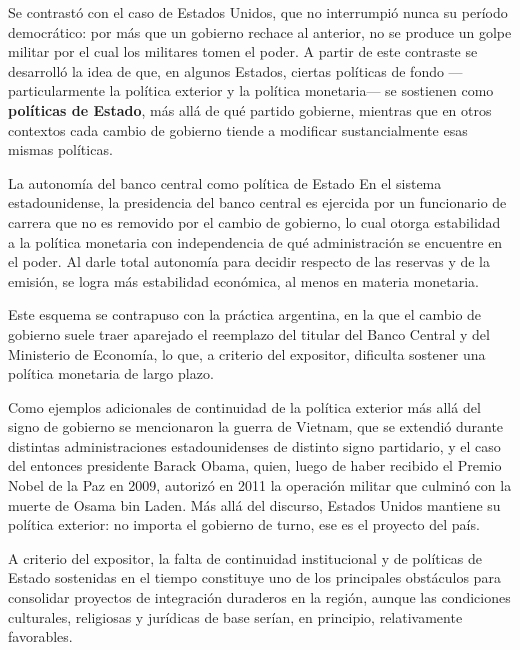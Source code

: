 \documentclass[12pt,oneside]{book}
\begin{document}
Se contrastó con el caso de Estados Unidos, que no interrumpió nunca su período democrático: por más que un gobierno rechace al anterior, no se produce un golpe militar por el cual los militares tomen el poder. A partir de este contraste se desarrolló la idea de que, en algunos Estados, ciertas políticas de fondo —particularmente la política exterior y la política monetaria— se sostienen como \textbf{políticas de Estado}, más allá de qué partido gobierne, mientras que en otros contextos cada cambio de gobierno tiende a modificar sustancialmente esas mismas políticas.

\begin{example}{La autonomía del banco central como política de Estado}
En el sistema estadounidense, la presidencia del banco central es ejercida por un funcionario de carrera que no es removido por el cambio de gobierno, lo cual otorga estabilidad a la política monetaria con independencia de qué administración se encuentre en el poder. Al darle total autonomía para decidir respecto de las reservas y de la emisión, se logra más estabilidad económica, al menos en materia monetaria.

Este esquema se contrapuso con la práctica argentina, en la que el cambio de gobierno suele traer aparejado el reemplazo del titular del Banco Central y del Ministerio de Economía, lo que, a criterio del expositor, dificulta sostener una política monetaria de largo plazo.
\end{example}

Como ejemplos adicionales de continuidad de la política exterior más allá del signo de gobierno se mencionaron la guerra de Vietnam, que se extendió durante distintas administraciones estadounidenses de distinto signo partidario, y el caso del entonces presidente Barack Obama, quien, luego de haber recibido el Premio Nobel de la Paz en 2009, autorizó en 2011 la operación militar que culminó con la muerte de Osama bin Laden. Más allá del discurso, Estados Unidos mantiene su política exterior: no importa el gobierno de turno, ese es el proyecto del país.

\begin{important}
A criterio del expositor, la falta de continuidad institucional y de políticas de Estado sostenidas en el tiempo constituye uno de los principales obstáculos para consolidar proyectos de integración duraderos en la región, aunque las condiciones culturales, religiosas y jurídicas de base serían, en principio, relativamente favorables.
\end{important}
\end{document}

